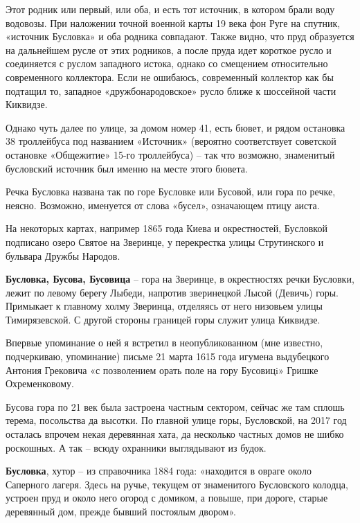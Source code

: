Этот родник или первый, или оба, и есть тот источник, в котором брали воду водовозы. При наложении точной военной карты 19 века фон Руге на спутник, «источник Бусловка» и оба родника совпадают. Также видно, что пруд образуется на дальнейшем русле от этих родников, а после пруда идет короткое русло и соединяется с руслом западного истока, однако со смещением относительно современного коллектора. Если не ошибаюсь, современный коллектор как бы подтащил то, западное «дружбонародовское» русло ближе к шоссейной части Киквидзе.

Однако чуть далее по улице, за домом номер 41, есть бювет, и рядом остановка 38 троллейбуса под названием «Источник» (вероятно соответствует советской остановке «Общежитие» 15-го троллейбуса) – так что возможно, знаменитый бусловский источник был именно на месте этого бювета.

Речка Бусловка названа так по горе Бусловке или Бусовой, или гора по речке, неясно. Возможно, именуется от слова «бусел», означающем птицу аиста.

На некоторых картах, например 1865 года Киева и окрестностей, Бусловкой подписано озеро Святое на Зверинце, у перекрестка улицы Струтинского и бульвара Дружбы Народов.\\

\medskip

\textbf{Бусловка, Бусова, Бусовица} – гора на Зверинце, в окрестностях речки Бусловки, лежит по левому берегу Лыбеди, напротив зверинецкой Лысой (Девичь) горы. Примыкает к главному холму Зверинца, отделяясь от него низовьем улицы Тимирязевской. С другой стороны границей горы служит улица Киквидзе. 

Впервые упоминание о ней я встретил в не\-опубликованном (мне известно, подчеркиваю, упоминание) письме 21 марта 1615 года игумена выдубецкого Антония Грековича «с позволением орать поле на гору Бусовицi» Гришке Охременковому.

Бусова гора по 21 век была застроена частным сектором, сейчас же там сплошь терема, посольства да высотки. По главной улице горы, Бусловской, на 2017 год осталась впрочем некая деревянная хата, да несколько частных домов не шибко роскошных. А так – всюду охранники выглядывают из будок.\\ 

\medskip

\textbf{Бусловка}, хутор – из справочника 1884 года: «находится в овраге около Саперного лагеря. Здесь на ручье, текущем от знаменитого Бусловского колодца, устроен пруд и около него огород с домиком, а повыше, при дороге, старые деревянный дом, прежде бывший постоялым двором».\\
\medskip


